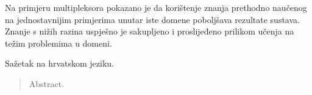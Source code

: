 \documentclass[times, utf8, zavrsni]{fer}
\begin{document}
Na primjeru multipleksora pokazano je da korištenje znanja prethodno naučenog na jednostavnijim primjerima unutar iste domene poboljšava rezultate sustava.
Znanje s nižih razina uspješno je sakupljeno i proslijeđeno prilikom učenja na težim problemima u domeni.




\begin{sazetak}
Sažetak na hrvatskom jeziku.

\end{sazetak}

\begin{abstract}
Abstract.

\end{abstract}
\end{document}

